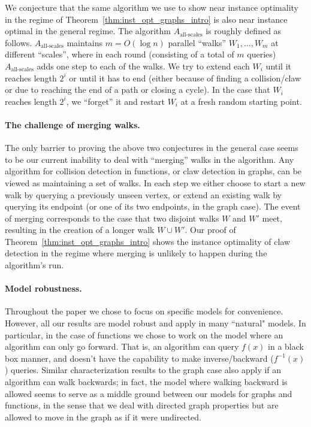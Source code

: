 \documentclass[11pt]{article}
\numberwithin{equation}{section}
\newcommand{\1}{\mathbf{1}}
\begin{document}
We conjecture that the same algorithm we use to show near instance optimality in the regime of Theorem~\ref{thm:inst_opt_graphs_intro}
is also near instance optimal in the general regime. The algorithm $A_{\text{all-scales}}$ is roughly defined as follows. $A_{\text{all-scales}}$ maintains $m = O(\log n)$ parallel ``walks'' $W_1, \ldots, W_m$ at different ``scales'', where in each round (consisting of a total of $m$ queries) $A_{\text{all-scales}}$ adds one step to each of the walks. We try to extend each $W_i$ until it reaches length $2^i$ or until it has to end (either because of finding a collision/claw or due to reaching the end of a path or closing a cycle). In the case that $W_i$ reaches length $2^i$, we ``forget'' it and restart $W_i$ at a fresh random starting point. 

\paragraph{The challenge of merging walks.}
The only barrier to proving the above two conjectures in the general case seems to be our current inability to deal with ``merging'' walks in the algorithm. Any algorithm for collision detection in functions, or claw detection in graphs, can be viewed as maintaining a set of walks. In each step we either choose to start a new walk by querying a previously unseen vertex, or extend an existing walk by querying its endpoint (or one of its two endpoints, in the graph case). The event of merging corresponds to the case that two disjoint walks $W$ and $W'$ meet, resulting in the creation of a longer walk $W \cup W'$. Our proof of Theorem~\ref{thm:inst_opt_graphs_intro} shows the instance optimality of claw detection in the regime where merging is unlikely to happen during the algorithm's run.









\label{subsec:discussion}

\paragraph{Model robustness.}
Throughout the paper we chose to focus on specific models for convenience. However, all our results are model robust and apply in many ``natural" models. In particular, in the case of functions we chose to work on the model where an algorithm can only go forward. That is, an algorithm can query $f(x)$ in a black box manner, and doesn't have the capability to make inverse/backward ($f^{-1}(x)$) queries. Similar characterization results to the graph case also apply if an algorithm can walk backwards; in fact, the model where walking backward is allowed seems to serve as a middle ground between our models for graphs and functions, in the sense that we deal with directed graph properties but are allowed to move in the graph as if it were undirected.
\end{document}
